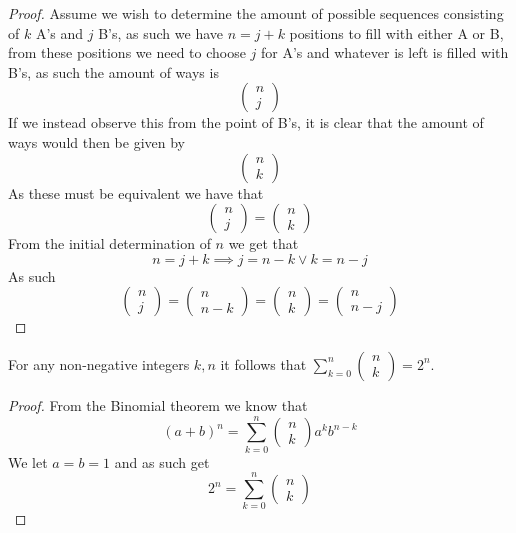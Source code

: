 \begin{proof}
  Assume we wish to determine the amount of possible sequences consisting of $k$ A's and $j$ B's, as such we have $n=j+k$ positions to fill with either A or B, from these positions we need to choose $j$ for A's and whatever is left is filled with B's, as such the amount of ways is
  \[
      \begin{pmatrix}n\\j\end{pmatrix}
  \]
  If we instead observe this from the point of B's, it is clear that the amount of ways would then be given by
  \[
      \begin{pmatrix}n\\k\end{pmatrix}
  \]
  As these must be equivalent we have that
  \[
      \begin{pmatrix}n\\j\end{pmatrix}=\begin{pmatrix}n\\k\end{pmatrix}
  \]
  From the initial determination of $n$ we get that
  \[
      n=j+k\implies j=n-k\vee k=n-j
  \]
  As such
  \[
      \begin{pmatrix}n\\j\end{pmatrix}=\begin{pmatrix}n\\n-k\end{pmatrix}=\begin{pmatrix}n\\k\end{pmatrix}=\begin{pmatrix}n\\n-j\end{pmatrix}
  \]
\end{proof}
\begin{theorem}
    For any non-negative integers $k,n$ it follows that $\sum_{k=0}^{n}\begin{pmatrix}n\\k\end{pmatrix}=2^{n}$.
\end{theorem}
\begin{proof}
  From the Binomial theorem we know that
  \[
      (a+b)^{n}=\sum_{k=0}^{n}\begin{pmatrix}n\\k\end{pmatrix}a^{k}b^{n-k}
  \]
  We let $a=b=1$ and as such get
  \[
      2^{n}=\sum_{k=0}^{n}\begin{pmatrix}n\\k\end{pmatrix}
  \]
\end{proof}
